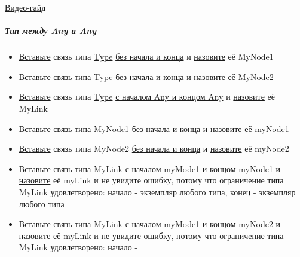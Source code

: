 \href{https://youtu.be/fUpXOe8vlsE}{Видео-гайд}
\subparagraph{Тип между Any и Any}
\begin{itemize}
      \item \hyperlink{DeepCase.InsertLink.Description}{Вставьте} связь типа
            \hyperlink{Core.Type.Description}{Type}
            \hyperlink{FAQ.HowToInsertLinkWithoutFromAndTo}{без
                  начала и конца} и \hyperlink{FAQ.HowToSetName}{назовите} её
            MyNode1
      \item \hyperlink{DeepCase.InsertLink.Description}{Вставьте} связь типа
            \hyperlink{Core.Type.Description}{Type}
            \hyperlink{FAQ.HowToInsertLinkWithoutFromAndTo}{без
                  начала и конца} и \hyperlink{FAQ.HowToSetName}{назовите} её
            MyNode2
      \item \hyperlink{DeepCase.InsertLink.Description}{Вставьте} связь типа
            \hyperlink{Core.Type.Description}{Type}
            \hyperlink{FAQ.HowToInsertLinkWithFromAndTo}{с
                  началом Any и концом Any} и
            \hyperlink{FAQ.HowToSetName}{назовите} её
            MyLink
      \item \hyperlink{DeepCase.InsertLink.Description}{Вставьте} связь типа
            MyNode1
            \hyperlink{FAQ.HowToInsertLinkWithoutFromAndTo}{без начала и конца}
            и
            \hyperlink{FAQ.HowToSetName}{назовите} её myNode1
      \item \hyperlink{DeepCase.InsertLink.Description}{Вставьте} связь типа
            MyNode2
            \hyperlink{FAQ.HowToInsertLinkWithoutFromAndTo}{без начала и конца}
            и
            \hyperlink{FAQ.HowToSetName}{назовите} её myNode2
      \item \hyperlink{DeepCase.InsertLink.Description}{Вставьте} связь типа
            MyLink
            \hyperlink{FAQ.HowToInsertLinkWithFromAndTo}{с началом myMode1 и
                  концом
                  myNode1} и \hyperlink{FAQ.HowToSetName}{назовите} её myLink и
            не
            увидите
            ошибку, потому что ограничение типа MyLink удовлетворено: начало -
            экземпляр
            любого типа, конец - экземпляр любого типа
      \item \hyperlink{DeepCase.InsertLink.Description}{Вставьте} связь типа
            MyLink
            \hyperlink{FAQ.HowToInsertLinkWithFromAndTo}{с началом myMode1 и
                  концом
                  myNode2} и \hyperlink{FAQ.HowToSetName}{назовите} её myLink и
            не
            увидите
            ошибку, потому что ограничение типа MyLink удовлетворено: начало -

\end{itemize}
